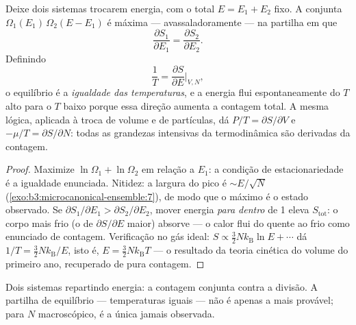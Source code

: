 \begin{theorem}\label{thm:b3:microcanonical-ensemble:temperature}
Deixe dois sistemas trocarem energia, com o total $E = E_1 + E_2$
fixo. A  conjunta $\Omega_1(E_1)\,\Omega_2(E - E_1)$ é
máxima --- avassaladoramente --- na partilha em que
\[
\frac{\partial S_1}{\partial E_1} =
\frac{\partial S_2}{\partial E_2} .
\]
Definindo
\[
\frac1T = \frac{\partial S}{\partial E}\bigg|_{V,N} ,
\]
o equilíbrio é a \emph{igualdade das temperaturas}, e a energia flui
espontaneamente do $T$ alto para o $T$ baixo porque essa direção
aumenta a contagem total. A mesma lógica, aplicada à troca de volume e
de partículas, dá $P/T = \partial S/\partial V$ e $-\mu/T
= \partial S/\partial N$: todas as grandezas intensivas da
termodinâmica são derivadas da contagem.
\end{theorem}

\begin{proof}
Maximize $\ln\Omega_1 + \ln\Omega_2$ em relação a $E_1$: a condição de
estacionariedade é a igualdade enunciada. Nitidez: a largura do pico é
$\sim E/\sqrt N$ (\cref{exo:b3:microcanonical-ensemble:7}), de modo que
o máximo é o estado observado. Se $\partial S_1/\partial E_1 >
\partial S_2/\partial E_2$, mover energia \emph{para dentro} de 1 eleva
$S_{\text{tot}}$: o corpo mais frio (o de $\partial S/\partial E$
maior) absorve --- o calor flui do quente ao frio como enunciado de
contagem. Verificação no gás ideal: $S \propto \tfrac32 Nk_{\text{B}}\ln E + \cdots$
dá $1/T = \tfrac32 Nk_{\text{B}}/E$, isto é, $E = \tfrac32
Nk_{\text{B}}T$ --- o resultado da teoria cinética do volume do
primeiro ano, recuperado de pura contagem.
\end{proof}

\begin{omfigure}

{\small Dois sistemas repartindo energia: a contagem conjunta contra a
divisão. A partilha de equilíbrio --- temperaturas iguais --- não é
apenas a mais provável; para $N$ macroscópico, é a única jamais
observada.}
\end{omfigure}


